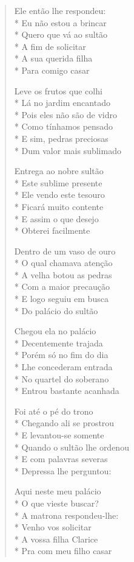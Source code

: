 \begin{verse}
Ele então lhe respondeu:\\*
Eu não estou a brincar\\*
Quero que vá ao sultão\\*
A fim de solicitar\\*
A sua querida filha\\*
Para comigo casar

Leve os frutos que colhi\\*
Lá no jardim encantado\\*
Pois eles não são de vidro\\*
Como tínhamos pensado\\*
E sim, pedras preciosas\\*
Dum valor mais sublimado

Entrega ao nobre sultão\\*
Este sublime presente\\*
Ele vendo este tesouro\\*
Ficará muito contente\\*
E assim o que desejo\\*
Obterei facilmente

Dentro de um vaso de ouro\\*
O qual chamava atenção\\*
A velha botou as pedras\\*
Com a maior precaução\\*
E logo seguiu em busca\\*
Do palácio do sultão

Chegou ela no palácio\\*
Decentemente trajada\\*
Porém só no fim do dia\\*
Lhe concederam entrada\\*
No quartel do soberano\\*
Entrou bastante acanhada

Foi até o pé do trono\\*
Chegando ali se prostrou\\*
E levantou-se somente\\*
Quando o sultão lhe ordenou\\*
E com palavras severas\\*
Depressa lhe perguntou:

Aqui neste meu palácio\\*
O que vieste buscar?\\*
A matrona respondeu-lhe:\\*
Venho vos solicitar\\*
A vossa filha Clarice\\*
Pra com meu filho casar


\end{verse}
